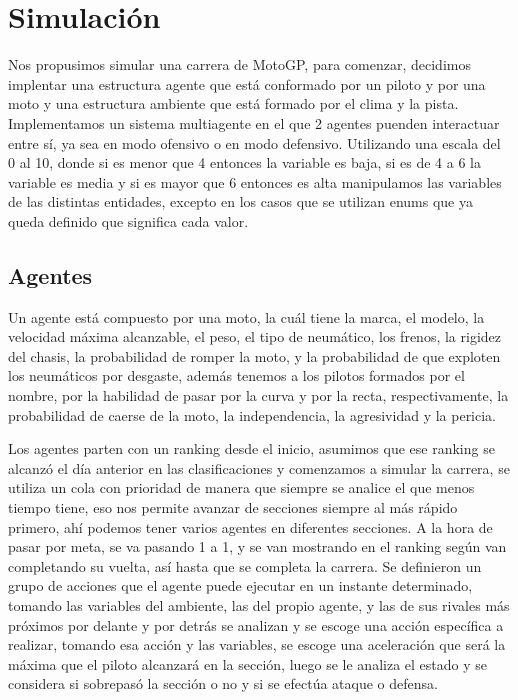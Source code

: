 \documentclass[12pt, letterpaper,spanish]{article}
\theoremstyle{definition}
\theoremstyle{remark}
\begin{document}
\section{Simulación}\cite{conferenciasS}\cite{garcia}
	Nos propusimos simular una carrera de MotoGP, para comenzar, decidimos implentar una estructura agente que está conformado por un piloto y por una moto y una estructura ambiente que está formado por el clima y la pista. Implementamos un sistema multiagente en el que 2 agentes puenden interactuar entre sí, ya sea en modo ofensivo o en modo defensivo. Utilizando una escala del 0 al 10, donde si es menor que 4 entonces la variable es baja, si es de 4 a 6 la variable es media y si es mayor que 6 entonces es alta manipulamos las variables de las distintas entidades, excepto en los casos que se utilizan enums que ya queda definido que significa cada valor.
	
	\subsection{Agentes}
		Un agente está compuesto por una moto, la cuál tiene la marca, el modelo, la velocidad máxima alcanzable, el peso, el tipo de neumático, los frenos, la rigidez del chasis, la probabilidad de romper la moto, y la probabilidad de que exploten los neumáticos por desgaste, además tenemos a los pilotos formados por el nombre, por la habilidad de pasar por la curva y por la recta, respectivamente, la probabilidad de caerse de la moto, la independencia, la agresividad y la pericia.
		
		Los agentes parten con un ranking desde el inicio, asumimos que ese ranking se alcanzó el día anterior en las clasificaciones y comenzamos a simular la carrera, se utiliza un cola con prioridad de manera que siempre se analice el que menos tiempo tiene, eso nos permite avanzar de secciones siempre al más rápido primero, ahí podemos tener varios agentes en diferentes secciones. A la hora de pasar por meta, se va pasando 1 a 1, y se van mostrando en el ranking según van completando su vuelta, así hasta que se completa la carrera. Se definieron un grupo de acciones que el agente puede ejecutar en un instante determinado, tomando las variables del ambiente, las del propio agente, y las de sus rivales más próximos por delante y por detrás se analizan y se escoge una acción específica a realizar, tomando esa acción y las variables, se escoge una aceleración que será la máxima que el piloto alcanzará en la sección, luego se le analiza el estado y se considera si sobrepasó la sección o no y si se efectúa ataque o defensa. 
		
\end{document}
